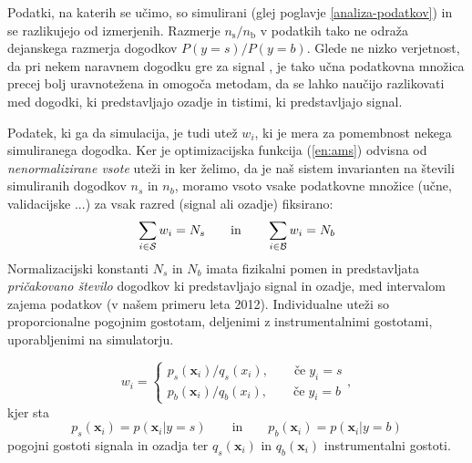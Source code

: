 \documentclass[11pt,a4paper,openany]{book}
\begin{document}
Podatki, na katerih se učimo, so simulirani (glej poglavje \ref{analiza-podatkov}) in se razlikujejo od izmerjenih. Razmerje $n_\text{s} / n_\text{b}$ v podatkih tako ne odraža dejanskega razmerja dogodkov $P(y = s) / P(y = b)$. Glede ne nizko verjetnost, da pri nekem naravnem dogodku gre za signal \cite{Adam-Bourdarios14}, je tako učna podatkovna množica precej bolj uravnotežena in omogoča metodam, da se lahko naučijo razlikovati med dogodki, ki predstavljajo ozadje in tistimi, ki predstavljajo signal.

Podatek, ki ga da simulacija, je tudi utež $w_i$, ki je mera za pomembnost nekega simuliranega dogodka. Ker je optimizacijska funkcija (\ref{en:ams}) odvisna od \textit{nenormalizirane vsote} uteži in ker želimo, da je naš sistem invarianten na števili simuliranih dogodkov $n_s$ in $n_b$, moramo vsoto vsake podatkovne množice (učne, validacijske ...) za vsak razred (signal ali ozadje) fiksirano:
\begin{equation}
\sum_{i \in \cal{S}}{w_i} = N_s
\qquad\text{in}\qquad
\sum_{i \in \cal{B}}{w_i} = N_b
\label{eq:sumweights}
\end{equation}
Normalizacijski konstanti $N_s$ in $N_b$ imata fizikalni pomen in predstavljata \textit{pričakovano število} dogodkov ki predstavljajo signal in ozadje, med intervalom zajema podatkov (v našem primeru leta 2012). Individualne uteži so proporcionalne pogojnim gostotam, deljenimi z instrumentalnimi gostotami, uporabljenimi na simulatorju.

\begin{equation}
	w_i = \left\{\begin{array}{r}
		p_s(\textbf{x}_i)/q_s(x_i),\qquad \text{če}\;y_i = s \\
		p_b(\textbf{x}_i)/q_b(x_i),\qquad \text{če}\;y_i = b 
	\end{array}
	\right.,
	\label{eq:weightseparation}
\end{equation}
kjer sta
\begin{equation*}
p_s(\textbf{x}_i) = p(\textbf{x}_i|y = s) \qquad \text{in} \qquad p_b(\textbf{x}_i) = p(\textbf{x}_i|y = b)
\end{equation*}
pogojni gostoti signala in ozadja ter $q_s(\textbf{x}_i)$ in $q_b(\textbf{x}_i)$ instrumentalni gostoti.
\end{document}
